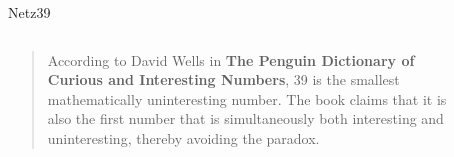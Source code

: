 \documentclass[hyperref={pdfpagelabels=false}]{beamer}
\begin{document}
\begin{frame}[label=secpony]{Netz39}
    \begin{columns}
        \begin{column}{0.6\textwidth}
            \begin{quote}
                According to David Wells in \textbf{The Penguin Dictionary of Curious and Interesting Numbers}, 39 is the smallest mathematically uninteresting number. The book claims that it is also the first number that is simultaneously both interesting and uninteresting, thereby avoiding the paradox. \cite{Wikipedia2010}
            \end{quote}
        \end{column}
        \begin{column}{0.4\textwidth}
            \begin{figure}
            \end{figure}
        \end{column}
    \end{columns}
\end{frame}
\end{document}
